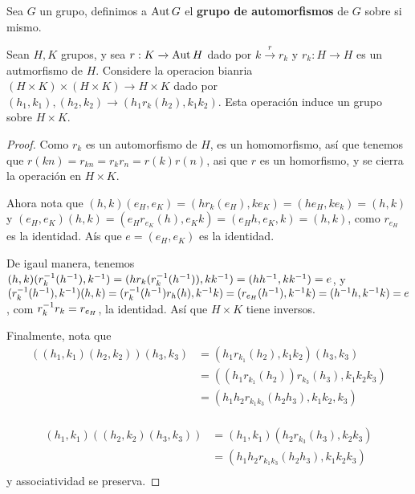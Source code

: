 \begin{definition}
    Sea $G$ un grupo, definimos a $\operatorname{Aut}{G}$ el \textbf{grupo de automorfismos}
    de $G$ sobre si mismo.
\end{definition}

\begin{lemma}\label{}
    Sean $H,K$ grupos, y sea  $r:K \xrightarrow{} \operatorname{Aut}{H}$ dado por $k
    \xrightarrow{r} r_k$ y $r_k:H \xrightarrow{} H$ es un autmorfismo de $H$.
    Considere la operacion bianria  $(H \times K) \times (H \times K)
    \xrightarrow{} H \times K$ dado por $(h_1,k_1),(h_2,k_2) \xrightarrow{}
    (h_1r_k(h_2),k_1k_2)$. Esta operaci\'on induce un grupo sobre $H \times K$.
\end{lemma}
\begin{proof}
    Como $r_k$ es un automorfismo de  $H$, es un homomorfismo, as\'i que tenemos
    que  $r(kn)=r_{kn}=r_kr_n=r(k)r(n)$, as\;i que $r$ es un homorfismo, y se
    cierra la operaci\'on en  $H \times K$.

    Ahora nota que
    $(h,k)(e_H,e_K)=(hr_k(e_H),ke_K)=(he_H,ke_k)=(h,k)$ y
    $(e_H,e_K)(h,k)=(e_Hr_{e_K}(h), e_Kk)=(e_Hh,e_K,k)=(h,k)$, como $r_{e_H}$ es
    la identidad. A\'is que $e=(e_H,e_K)$ es la identidad.

    De igaul manera, tenemos $(h,k)(r_k^{-1}(h^{-1}),
    k^{-1})=(hr_k(r_k^{-1}(h^{-1})), kk^{-1})=(hh^{-1},kk^{-1})=e$, y
    $(r_k^{-1}(h^{-1}),k^{-1})(h,k)=(r_k^{-1}(h^{-1})r_h(h),
    k^{-1}k)=(r_{e_H}(h^{-1}),k^{-1}k)=(h^{-1}h,k^{-1}k)=e$, com
    $r_k^{-1}r_k=r_{e_H}$, la identidad. As\'i que $H \times K$ tiene inversos.

    Finalmente, nota que
    \begin{align*}
        ((h_1,k_1)(h_2,k_2))(h_3,k_3) &= (h_1r_{k_1}(h_2), k_1k_2)(h_3,
        k_3)    \\
                                      &=
                                      ((h_1r_{k_1}(h_2))r_{k_3}(h_3),k_1k_2k_3) \\
                                      &= (h_1h_2r_{k_1k_3}(h_2h_3), k_1k_2,k_3)  \\
    \end{align*}

    \begin{align*}
        (h_1,k_1)((h_2,k_2)(h_3,k_3)) &= (h_1,k_1)(h_2r_{k_3}(h_3),
        k_2k_3) \\
                                    &=(h_1h_2r_{k_1k_3}(h_2h_3),k_1k_2k_3) \\
    \end{align*}
    y associatividad se preserva.
\end{proof}

